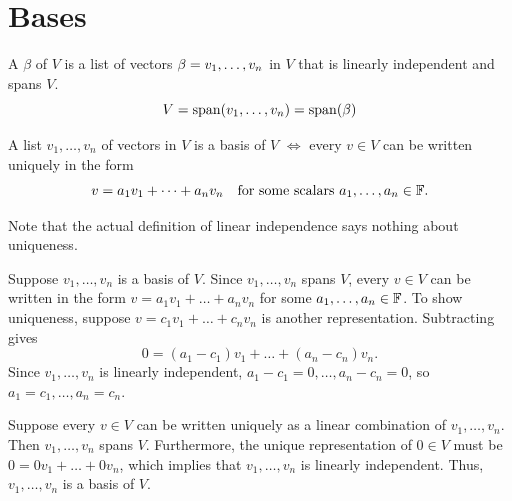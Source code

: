 \section{Bases}

\setcounter{thm}{25}
\begin{mydef} [basis]
  A  $\beta$ of $V$ is a list of vectors $\beta = v_1, \dots, v_n$ in $V$ that is linearly independent and spans $V$.
  \begin{equation}
    V = \operatorname{span} (v_1, \dots, v_n) = \operatorname{span} ( \beta )
  \end{equation}
\end{mydef}

\setcounter{thm}{27}
\begin{thm} 
  A list $v_1, \dots, v_n$ of vectors in $V$ is a basis of $V$ $\iff$ every $v \in V$ can be written uniquely in the form
  \begin{equation}
    v = a_1 v_1 + \dots + a_n v_n \quad \text{for some scalars } a_1, \dots, a_n \in \mathbb{F}.
  \end{equation}

  Note that the actual definition of linear independence says nothing about uniqueness.
\end{thm}
\begin{prf}
  \begin{description}
    \item{\Rightarrowdirection} Suppose $v_1, \dots, v_n$ is a basis of $V$. Since $v_1, \dots, v_n$ spans $V$, every $v \in V$ can be written in the form $v = a_1 v_1 + \dots + a_n v_n$ for some $a_1, \dots, a_n \in \mathbb{F}$. To show uniqueness, suppose $v = c_1 v_1 + \dots + c_n v_n$ is another representation. Subtracting gives
    \begin{equation}
      0 = (a_1 - c_1) v_1 + \dots + (a_n - c_n) v_n.
    \end{equation}
    Since $v_1, \dots, v_n$ is linearly independent, $a_1 - c_1 = 0, \dots, a_n - c_n = 0$, so $a_1 = c_1, \dots, a_n = c_n$.

    \item{\Leftarrowdirection} Suppose every $v \in V$ can be written uniquely as a linear combination of $v_1, \dots, v_n$. Then $v_1, \dots, v_n$ spans $V$. Furthermore, the unique representation of $0 \in V$ must be $0 = 0v_1 + \dots + 0v_n$, which implies that $v_1, \dots, v_n$ is linearly independent. Thus, $v_1, \dots, v_n$ is a basis of $V$.
  \end{description}
  \vspace{-\baselineskip}
\end{prf}

